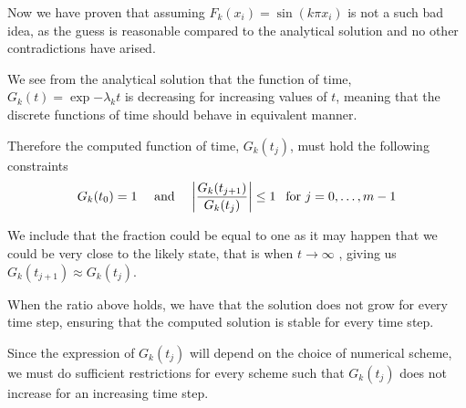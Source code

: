Now we have proven that assuming \(F_k(x_i) = \sin(k\pi x_i)\) is not a such bad idea, as the guess is reasonable compared to the analytical solution and no other contradictions have arised.

We see from the analytical solution that the function of time, \(G_k(t) = \exp{-\lambda_k t}\) is decreasing for increasing values of \(t\), meaning that the discrete functions of time should behave in equivalent manner.

Therefore the computed function of time, \(G_k(t_j)\), must hold the following constraints
\[
    G_k(t_{0}) = 1 \quad \text{ and }\quad \abs{\frac{G_k(t_{j+1}) } {G_k(t_j) } }\leq 1 \:\:\text{ for } j = 0, \dots,m-1
\]

We include that the fraction could be equal to one as it may happen that we could be very close to the likely state, that is when \(t \to \infty \)  , giving us \( G_k(t_{j+1}) \approx G_k(t_{j})\).

When the ratio above holds, we have that the solution does not grow for every time step, ensuring that the computed solution is stable for every time step.

Since the expression of \(G_k(t_{j})\) will depend on the choice of numerical scheme, we must do sufficient restrictions for every scheme  such that \(G_k(t_{j})\) does not increase for an increasing time step.
